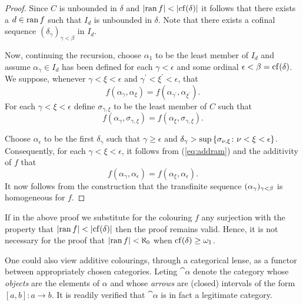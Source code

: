 \begin{proof}
	Since $C$ is unbounded in $\delta$ and $\left\lvert\operatorname{ran} f\right\rvert<\left\lvert\operatorname{cf}(\delta)\right\rvert$
	it follows that there exists a $d\in\operatorname{ran} f$ such that $I_d$ is unbounded
	in $\delta$.  Note that there exists a cofinal sequence
	$(\delta_\gamma)_{\gamma<\beta}$ in $I_d$.

	Now, continuing the recursion, choose $\alpha_1$ to be the least member of
	$I_d$ and assume $\alpha_\gamma\in I_d$ has been defined for each
	$\gamma<\epsilon$ and some ordinal $\epsilon<\beta=\operatorname{cf}(\delta)$.  We
	suppose, whenever $\gamma<\xi<\epsilon$ and
	$\gamma^\prime<\xi^\prime<\epsilon$, that
	\begin{equation}
		f(\alpha_\gamma,\alpha_\xi)=f(\alpha_{\gamma^\prime},\alpha_{\xi^\prime}).
	\end{equation}
	For each $\gamma<\xi<\epsilon$ define $\sigma_{\gamma,\xi}$ to be the least
	member of $C$ such that
	\begin{equation}\label{eq:addram}
		f(\alpha_\gamma,\sigma_{\gamma,\xi})=f(\alpha_\xi,\sigma_{\gamma,\xi}).
	\end{equation}

	Choose $\alpha_\epsilon$ to be the first $\delta_\gamma$ such that
	$\gamma\geq\epsilon$ and
	$\delta_\gamma>\sup\left\lbrace \sigma_{\nu,\xi}\colon \nu<\xi<\epsilon \right\rbrace$.
	Consequently, for each $\gamma<\xi<\epsilon$, it follows from
	(\ref{eq:addram}) and the additivity of $f$ that
	\begin{equation}
		f(\alpha_\gamma,\alpha_\epsilon)=f(\alpha_\xi,\alpha_\epsilon).
	\end{equation}
	It now follows from the construction that the transfinite sequence
	$(\alpha_\gamma)_{\gamma<\beta}$ is homogeneous for $f$.
\end{proof}

\begin{rem}
	If in the above proof we substitute for the colouring $f$ any surjection
	with the property that $\left\lvert\operatorname{ran} f\right\rvert<\left\lvert\operatorname{cf}(\delta)\right\rvert$ then the proof
	remains valid.  Hence, it is not necessary for the proof that $\left\lvert\operatorname{ran}
			f\right\rvert<\aleph_0$ when $\operatorname{cf}(\delta)\geq\omega_1$.
\end{rem}

One could also view additive colourings, through a categorical lense, as a
functor between appropriately chosen categories.  Leting $\cat{\alpha}$ denote
the category whose \textit{objects} are the elements of $\alpha$ and whose
\textit{arrows} are (closed) intervals of the form $[a,b]\colon a\to b$.  It is
readily verified that $\cat{\alpha}$ is in fact a legitimate category.

